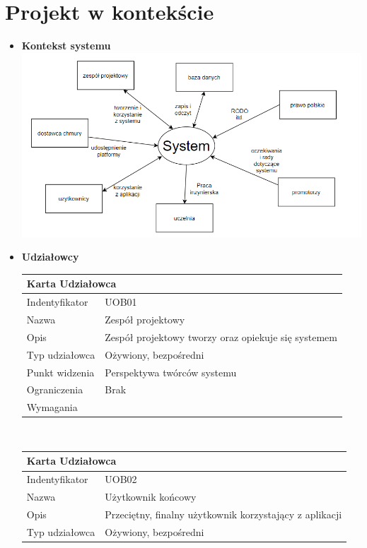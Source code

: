 \documentclass[a4paper,11pt]{report}
\begin{document}
\section{Projekt w kontekście}
\begin{itemize}
	\item \textbf{Kontekst systemu}\\
	\includegraphics[width=15 cm, left]{system.png}\\
	\item \textbf{Udziałowcy}\\
	\begin{tabular}{|p{3cm}|p{11cm}|}
	\hline
	\multicolumn{2}{|l|}{\textbf{Karta Udziałowca}}\\
	\hline
	Indentyfikator&UOB01\\
	\hline
	Nazwa&Zespół projektowy\\
	\hline
	Opis&Zespół projektowy tworzy oraz opiekuje się systemem\\
	\hline
	Typ udziałowca&Ożywiony, bezpośredni\\
	\hline
	Punkt widzenia&Perspektywa twórców systemu\\
	\hline
	Ograniczenia&Brak\\
	\hline
	Wymagania&\\
	\hline
	\end{tabular}\\
	\begin{tabular}{|p{3cm}|p{11cm}|}
	\hline
	\multicolumn{2}{|l|}{\textbf{Karta Udziałowca}}\\
	\hline
	Indentyfikator&UOB02\\
	\hline
	Nazwa&Użytkownik końcowy\\
	\hline
	Opis&Przeciętny, finalny użytkownik korzystający z aplikacji\\
	\hline
	Typ udziałowca&Ożywiony, bezpośredni\\

\end{tabular}
\end{itemize}
\end{document}
